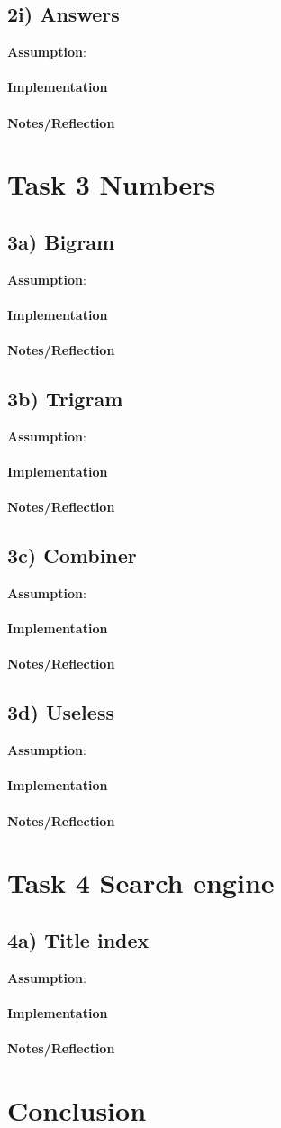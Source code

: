 \documentclass[fleqn,10pt]{wlscirep}
\begin{document}
\subsection*{2i) Answers }
\textbf{Assumption}:  \\ \\
\textbf{Implementation}  \\ \\
\textbf{Notes/Reflection}

\section*{Task 3 Numbers}

\subsection*{3a) Bigram }
\textbf{Assumption}:  \\ \\
\textbf{Implementation}  \\ \\
\textbf{Notes/Reflection}

\subsection*{3b) Trigram }
\textbf{Assumption}:  \\ \\
\textbf{Implementation}  \\ \\
\textbf{Notes/Reflection}

\subsection*{3c) Combiner }
\textbf{Assumption}:  \\ \\
\textbf{Implementation}  \\ \\
\textbf{Notes/Reflection}

\subsection*{3d) Useless}
\textbf{Assumption}:  \\ \\
\textbf{Implementation}  \\ \\
\textbf{Notes/Reflection}

\section*{Task 4 Search engine}
\subsection*{4a) Title index}
\textbf{Assumption}:  \\ \\
\textbf{Implementation}  \\ \\
\textbf{Notes/Reflection}

\section*{Conclusion}
\end{document}
